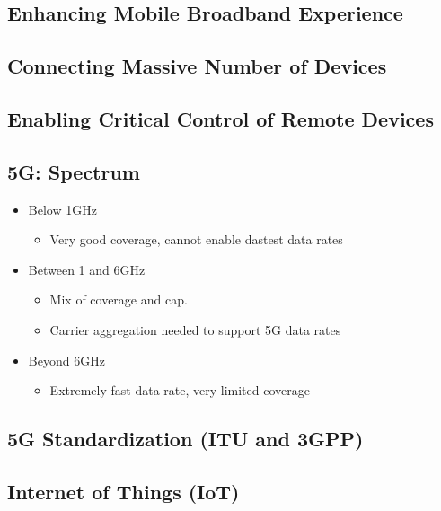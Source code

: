 \subsection{Enhancing Mobile Broadband Experience}

\subsection{Connecting Massive Number of Devices}

\subsection{Enabling Critical Control of Remote Devices}

\subsection{5G: Spectrum}

\begin{itemize}
	\item Below 1GHz
	\begin{itemize}
		\item Very good coverage, cannot enable dastest data rates
	\end{itemize}
	\item Between 1 and 6GHz
	\begin{itemize}
		\item Mix of coverage and cap.
		\item Carrier aggregation needed to support 5G data rates
	\end{itemize}
	\item Beyond 6GHz
	\begin{itemize}
		\item Extremely fast data rate, very limited coverage
	\end{itemize}
\end{itemize}

\subsection{5G Standardization (ITU and 3GPP)}

\subsection{Internet of Things (IoT)}

